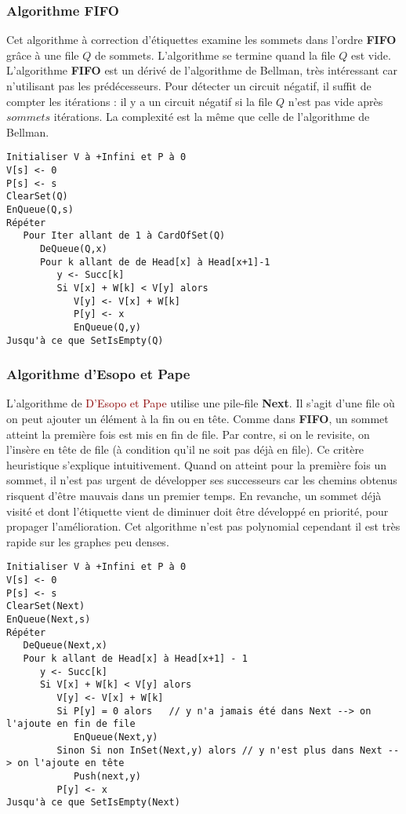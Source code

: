 \documentclass{article}
\newcommand{\red}[1]{\textcolor{darkred}{#1}}
\begin{document}
\subsubsection{Algorithme FIFO}

Cet algorithme à correction d’étiquettes examine les sommets dans l’ordre \textbf{FIFO} grâce à une file $Q$ de sommets. L’algorithme se termine quand la file $Q$ est vide.
L’algorithme \textbf{FIFO} est un dérivé de l’algorithme de Bellman, très intéressant car n’utilisant pas les prédécesseurs. Pour détecter un circuit négatif, il suffit de compter les 
itérations : il y a un circuit négatif si la file $Q$ n’est pas vide après $sommets$ itérations. La complexité est la même que celle de l’algorithme de Bellman.
\begin{verbatim}
Initialiser V à +Infini et P à 0
V[s] <- 0
P[s] <- s
ClearSet(Q)
EnQueue(Q,s)
Répéter
   Pour Iter allant de 1 à CardOfSet(Q)
      DeQueue(Q,x)
      Pour k allant de de Head[x] à Head[x+1]-1
         y <- Succ[k]
         Si V[x] + W[k] < V[y] alors
            V[y] <- V[x] + W[k]
            P[y] <- x
            EnQueue(Q,y)
Jusqu'à ce que SetIsEmpty(Q)
\end{verbatim}

\subsubsection{Algorithme d'Esopo et Pape}

L’algorithme de \red{D’Esopo et Pape} utilise une pile-file \textbf{Next}. Il s’agit d’une file où on peut ajouter un élément à la fin ou en tête. Comme dans \textbf{FIFO}, un 
sommet atteint la première fois est mis en fin de file. Par contre, si on le revisite, on l’insère en tête de file (à condition qu’il ne soit pas déjà en file). Ce critère heuristique 
s’explique intuitivement. Quand on atteint pour la première fois un sommet, il n’est pas urgent de développer ses successeurs car les chemins obtenus risquent d’être mauvais dans 
un premier temps. En revanche, un sommet déjà visité et dont l’étiquette vient de diminuer doit être développé en priorité, pour propager l’amélioration. Cet algorithme n’est pas 
polynomial cependant il est très rapide sur les graphes peu denses.
\newpage
\begin{verbatim}
Initialiser V à +Infini et P à 0
V[s] <- 0
P[s] <- s
ClearSet(Next)
EnQueue(Next,s)
Répéter
   DeQueue(Next,x)
   Pour k allant de Head[x] à Head[x+1] - 1
      y <- Succ[k]
      Si V[x] + W[k] < V[y] alors
         V[y] <- V[x] + W[k]
         Si P[y] = 0 alors   // y n'a jamais été dans Next --> on l'ajoute en fin de file
            EnQueue(Next,y)
         Sinon Si non InSet(Next,y) alors // y n'est plus dans Next --> on l'ajoute en tête
            Push(next,y)
         P[y] <- x
Jusqu'à ce que SetIsEmpty(Next)
\end{verbatim}
\end{document}
